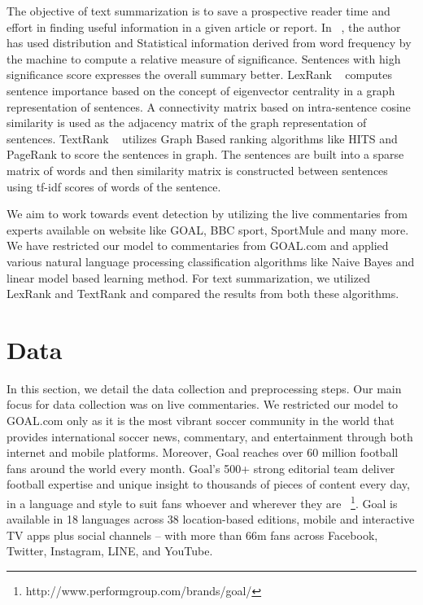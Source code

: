 \documentclass[11pt,letterpaper]{article}
\begin{document}
The objective of text summarization is to save a prospective reader time and effort in finding useful information in a given article or report. In ~\cite{luhn1958automatic}, the author has used distribution and Statistical information derived from word frequency by the machine to compute a relative measure of significance. Sentences with high significance score expresses the overall summary better. LexRank ~\cite{erkan2004lexrank} computes sentence importance based on the concept of eigenvector centrality in a graph representation of sentences. A connectivity matrix based on intra-sentence cosine similarity is used as the adjacency matrix of the graph representation of sentences. TextRank ~\cite{mihalcea2004textrank} utilizes Graph Based ranking algorithms like HITS and PageRank to score the sentences in graph. The sentences are built into a sparse matrix of words and then similarity matrix is constructed between sentences using tf-idf scores of words of the sentence.

We aim to work towards event detection by utilizing the live commentaries from experts available on website like GOAL, BBC sport, SportMule and many more. We have restricted our model to commentaries from GOAL.com and applied various natural language processing classification algorithms like Naive Bayes and linear model based learning method. For text summarization, we utilized LexRank and TextRank and compared the results from both these algorithms.\\


\section{Data}
In this section, we detail the data collection and preprocessing steps.
Our main focus for data collection was on live commentaries. We restricted our model to GOAL.com only as it is the most vibrant soccer community in the world that provides international soccer news, commentary, and entertainment through both internet and mobile platforms. Moreover, Goal reaches over 60 million football fans around the world every month. Goal’s 500+ strong editorial team deliver football expertise and unique insight to thousands of pieces of content every day, in a language and style to suit fans whoever and wherever they are ~\footnote{http://www.performgroup.com/brands/goal/}.
Goal is available in 18 languages across 38 location-based editions, mobile and interactive TV apps plus social channels – with more than 66m fans across Facebook, Twitter, Instagram, LINE, and YouTube.
\end{document}
